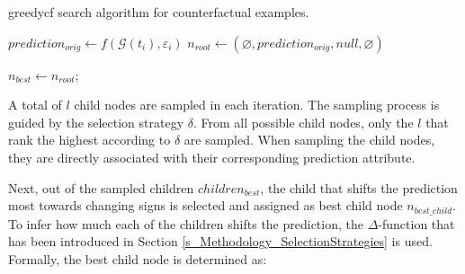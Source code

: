 {
\setlength{\algomargin}{1.25em}
\small
\begin{algorithm}[ht]
\caption{\gls{greedycf} search algorithm for counterfactual examples.}
\label{a_GreedyCF}
    $prediction_{orig} \gets f(\mathcal{G}(t_i), \varepsilon_i)$\; \label{a_GreedyCF_pred_orig}
    $n_{root} \gets (\varnothing, prediction_{orig}, null, \varnothing)$\; \label{a_GreedyCF_root_init}

    $n_{best} \gets n_{root}$; \label{a_GreedyCF_set_root_best}

\end{algorithm}
}


A total of $l$ child nodes are sampled in each iteration. The sampling process is guided by the selection strategy $\delta$. From all possible child nodes, only the $l$ that rank the highest according to $\delta$ are sampled. When sampling the child nodes, they are directly associated with their corresponding prediction attribute. 

Next, out of the sampled children $children_{best}$, the child that shifts the prediction most towards changing signs is selected and assigned as best child node $n_{best\_child}$. To infer how much each of the children shifts the prediction, the $\Delta$-function that has been introduced in Section \ref{s_Methodology_SelectionStrategies} is used. Formally, the best child node is determined as:


